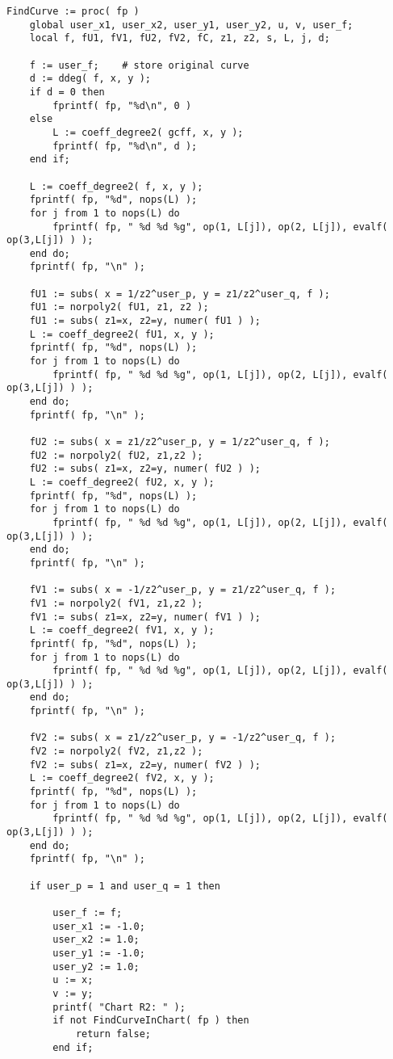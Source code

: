 \documentclass[a4paper,10pt]{article}
\begin{document}
\begin{lstlisting}[name=p5curves]
FindCurve := proc( fp )
    global user_x1, user_x2, user_y1, user_y2, u, v, user_f;
    local f, fU1, fV1, fU2, fV2, fC, z1, z2, s, L, j, d;

    f := user_f;    # store original curve
    d := ddeg( f, x, y );
    if d = 0 then
        fprintf( fp, "%d\n", 0 )
    else
        L := coeff_degree2( gcff, x, y );
        fprintf( fp, "%d\n", d );
    end if;

    L := coeff_degree2( f, x, y );
    fprintf( fp, "%d", nops(L) );
    for j from 1 to nops(L) do
        fprintf( fp, " %d %d %g", op(1, L[j]), op(2, L[j]), evalf( op(3,L[j]) ) );
    end do;
    fprintf( fp, "\n" );

    fU1 := subs( x = 1/z2^user_p, y = z1/z2^user_q, f );
    fU1 := norpoly2( fU1, z1, z2 );
    fU1 := subs( z1=x, z2=y, numer( fU1 ) );
    L := coeff_degree2( fU1, x, y );
    fprintf( fp, "%d", nops(L) );
    for j from 1 to nops(L) do
        fprintf( fp, " %d %d %g", op(1, L[j]), op(2, L[j]), evalf( op(3,L[j]) ) );
    end do;
    fprintf( fp, "\n" );

    fU2 := subs( x = z1/z2^user_p, y = 1/z2^user_q, f );
    fU2 := norpoly2( fU2, z1,z2 );
    fU2 := subs( z1=x, z2=y, numer( fU2 ) );
    L := coeff_degree2( fU2, x, y );
    fprintf( fp, "%d", nops(L) );
    for j from 1 to nops(L) do
        fprintf( fp, " %d %d %g", op(1, L[j]), op(2, L[j]), evalf( op(3,L[j]) ) );
    end do;
    fprintf( fp, "\n" );

    fV1 := subs( x = -1/z2^user_p, y = z1/z2^user_q, f );
    fV1 := norpoly2( fV1, z1,z2 );
    fV1 := subs( z1=x, z2=y, numer( fV1 ) );
    L := coeff_degree2( fV1, x, y );
    fprintf( fp, "%d", nops(L) );
    for j from 1 to nops(L) do
        fprintf( fp, " %d %d %g", op(1, L[j]), op(2, L[j]), evalf( op(3,L[j]) ) );
    end do;
    fprintf( fp, "\n" );

    fV2 := subs( x = z1/z2^user_p, y = -1/z2^user_q, f );
    fV2 := norpoly2( fV2, z1,z2 );
    fV2 := subs( z1=x, z2=y, numer( fV2 ) );
    L := coeff_degree2( fV2, x, y );
    fprintf( fp, "%d", nops(L) );
    for j from 1 to nops(L) do
        fprintf( fp, " %d %d %g", op(1, L[j]), op(2, L[j]), evalf( op(3,L[j]) ) );
    end do;
    fprintf( fp, "\n" );

    if user_p = 1 and user_q = 1 then

        user_f := f;
        user_x1 := -1.0;
        user_x2 := 1.0;
        user_y1 := -1.0;
        user_y2 := 1.0;
        u := x;
        v := y;
        printf( "Chart R2: " );
        if not FindCurveInChart( fp ) then
            return false;
        end if;


\end{lstlisting}
\end{document}
